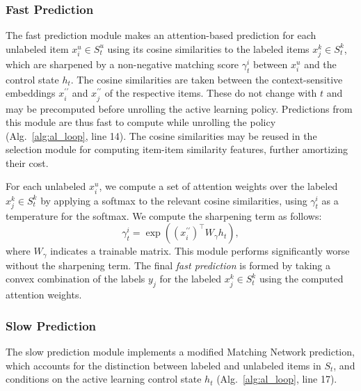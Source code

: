 \subsubsection{Fast Prediction}
\label{sec:fast_prediction}
The fast prediction module makes an attention-based prediction for each unlabeled item $x^u_i \in S^u_t$ using its cosine similarities to the labeled items $x^k_j \in S^k_t$, which are sharpened by a non-negative matching score $\gamma^i_t$ between $x^u_i$ and the control state $h_t$. The cosine similarities are taken between the context-sensitive embeddings $x^{\prime\prime}_i$ and $x^{\prime\prime}_j$ of the respective items. These do not change with $t$ and may be precomputed before unrolling the active learning policy. Predictions from this module are thus fast to compute while unrolling the policy (Alg.~\ref{alg:al_loop}, line 14). The cosine similarities may be reused in the selection module for computing item-item similarity features, further amortizing their cost.

For each unlabeled $x^u_i$, we compute a set of attention weights over the labeled $x^k_j \in S^k_t$ by applying a softmax to the relevant cosine similarities, using $\gamma^i_t$ as a temperature for the softmax. We compute the sharpening term as follows:
$$\gamma^i_t = \exp((x^{\prime\prime}_i)^{\top} W_{\gamma} h_t),$$
where $W_{\gamma}$ indicates a trainable matrix.
This module performs significantly worse without the sharpening term.
The final \emph{fast prediction} is formed by taking a convex combination of the labels $y_j$ for the labeled $x^k_j \in S^k_t$ using the computed attention weights.

\subsubsection{Slow Prediction}
\label{sec:slow_prediction}
The slow prediction module implements a modified Matching Network prediction, which accounts for the distinction between labeled and unlabeled items in $S_t$, and conditions on the active learning control state $h_t$ (Alg.~\ref{alg:al_loop}, line 17).

